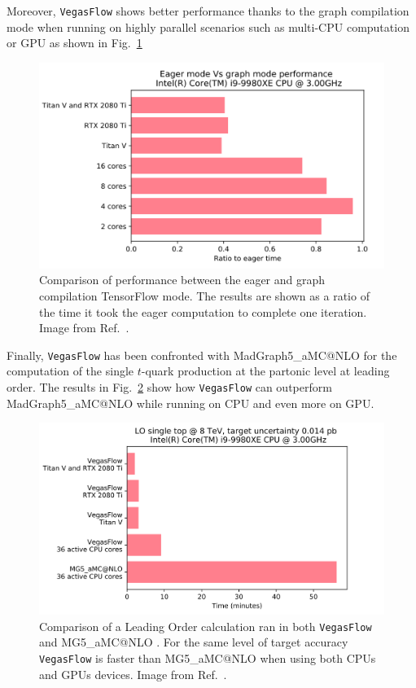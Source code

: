 \documentclass[../main/main.tex]{subfiles}
\begin{document}
Moreover, \texttt{VegasFlow} shows better performance thanks to the graph compilation mode when running on highly parallel scenarios such as
multi-CPU computation or GPU as shown in Fig.~\ref{vegasflow1}

\begin{figure}
	\centering
	\includegraphics[width=12cm]{../images/graph_mode.png}
	\caption{Comparison of performance between the eager and graph compilation TensorFlow mode. The results are shown as a ratio of the time it took the eager computation to complete one iteration. Image from Ref.~\cite{Carrazza:2020rdn}.}
	\label{vegasflow1}
\end{figure}


Finally, \texttt{VegasFlow} has been confronted with MadGraph5\_aMC@NLO \cite{Alwall:2014hca} for the computation of the single $t$-quark production at the partonic level at leading order. The results in Fig.~\ref{vegasflow2} show how \texttt{VegasFlow} can outperform  MadGraph5\_aMC@NLO while running on CPU and even more on GPU.

\begin{figure}
	\centering
	\includegraphics[width=12cm]{../images/vf_singletop.png}
	\caption{Comparison of a Leading Order calculation ran in both \texttt{VegasFlow} \cite{vegasflow_package} and MG5\_aMC@NLO \cite{Alwall:2014hca}. For the same level 
	of target accuracy \texttt{VegasFlow} is faster than  MG5\_aMC@NLO when using both CPUs and GPUs devices. Image from Ref.~\cite{Carrazza:2020rdn}.}
	\label{vegasflow2}
\end{figure}
\end{document}
